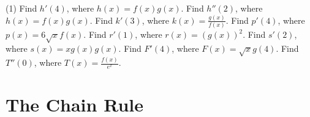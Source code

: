 \documentclass[12pt,]{book}
\theoremstyle{plain}
\theoremstyle{definition}
\numberwithin{equation}{section}
\newcommand{\fe}[2]{#1\mathopen{}\left(#2\right)\mathclose{}}
\newcommand{\fd}[1]{#1'}
\newcommand{\sd}[1]{#1''}
\begin{document}
\begin{exercisegroup}(1)
\exercise[33.]\hypertarget{exercise-433}{\null}Find \(\fe{\fd{h}}{4}\), where \(\fe{h}{x}=\fe{f}{x}\fe{g}{x}\).%
\exercise[34.]\hypertarget{exercise-434}{\null}Find \(\fe{\sd{h}}{2}\), where \(\fe{h}{x}=\fe{f}{x}\fe{g}{x}\).%
\exercise[35.]\hypertarget{exercise-435}{\null}Find \(\fe{\fd{k}}{3}\), where \(\fe{k}{x}=\frac{\fe{g}{x}}{\fe{f}{x}}\).%
\exercise[36.]\hypertarget{exercise-436}{\null}Find \(\fe{\fd{p}}{4}\), where \(\fe{p}{x}=6\sqrt{x}\fe{f}{x}\).%
\exercise[37.]\hypertarget{exercise-437}{\null}Find \(\fe{\fd{r}}{1}\), where \(\fe{r}{x}=\left(\fe{g}{x}\right)^2\).%
\exercise[38.]\hypertarget{exercise-438}{\null}Find \(\fe{\fd{s}}{2}\), where \(\fe{s}{x}=x\fe{g}{x}\fe{g}{x}\).%
\exercise[39.]\hypertarget{exercise-439}{\null}Find \(\fe{\fd{F}}{4}\), where \(\fe{F}{x}=\sqrt{x}\fe{g}{4}\).%
\exercise[40.]\hypertarget{exercise-440}{\null}Find \(\fe{\sd{T}}{0}\), where \(\fe{T}{x}=\frac{\fe{f}{x}}{e^x}\).%
\end{exercisegroup}
\par\smallskip\noindent
\typeout{************************************************}
\typeout{************************************************}
\chapter[The Chain Rule]{The Chain Rule}\label{chapter-chain-rule}
\typeout{************************************************}
\typeout{************************************************}
\end{document}
